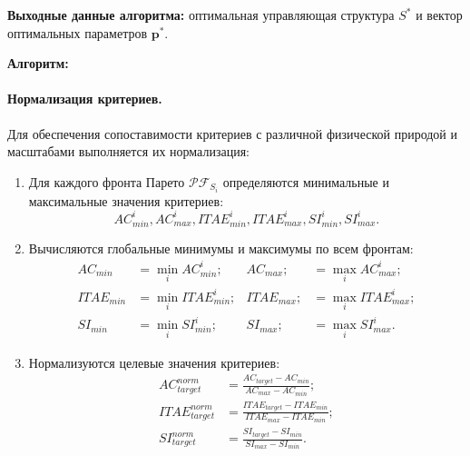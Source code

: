 \textbf{Выходные данные алгоритма:} оптимальная управляющая структура $S^*$ и вектор оптимальных параметров $\mathbf{p}^*$.

\textbf{Алгоритм:}

\paragraph*{Нормализация критериев.}

Для обеспечения сопоставимости критериев с различной
физической природой и масштабами выполняется их нормализация:

\begin{enumerate}
    \item Для каждого фронта Парето $\mathcal{PF}_{S_i}$ определяются минимальные и максимальные значения критериев:
          \begin{equation*}
              AC_{min}^i, AC_{max}^i, ITAE_{min}^i, ITAE_{max}^i, SI_{min}^i, SI_{max}^i.
          \end{equation*}

    \item Вычисляются глобальные минимумы и максимумы по всем фронтам:
          \begin{equation*}
              \begin{aligned}
                  AC_{min}   & = \min_i AC_{min}^i;   & AC_{max};   & = \max_i AC_{max}^i;\\
                  ITAE_{min} & = \min_i ITAE_{min}^i; & ITAE_{max}; & = \max_i ITAE_{max}^i;\\
                  SI_{min}   & = \min_i SI_{min}^i;   & SI_{max};   & = \max_i SI_{max}^i.
              \end{aligned}
          \end{equation*}

    \item Нормализуются целевые значения критериев:
          \begin{equation*}
              \begin{aligned}
                  AC_{target}^{norm}   & = \frac{AC_{target} - AC_{min}}{AC_{max} - AC_{min}};         \\
                  ITAE_{target}^{norm} & = \frac{ITAE_{target} - ITAE_{min}}{ITAE_{max} - ITAE_{min}}; \\
                  SI_{target}^{norm}   & = \frac{SI_{target} - SI_{min}}{SI_{max} - SI_{min}}.
              \end{aligned}
          \end{equation*}
\end{enumerate}

